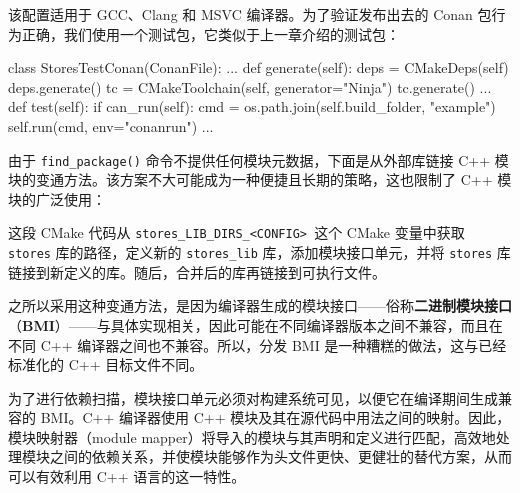 该配置适用于 GCC、Clang 和 MSVC 编译器。为了验证发布出去的 Conan 包行为正确，我们使用一个测试包，它类似于上一章介绍的测试包：

\begin{codebox}[python]
class StoresTestConan(ConanFile):
    ...
    def generate(self):
        deps = CMakeDeps(self)
        deps.generate()
        tc = CMakeToolchain(self, generator="Ninja")
        tc.generate()
    ...
    def test(self):
        if can_run(self):
            cmd = os.path.join(self.build_folder, "example")
            self.run(cmd, env="conanrun")
    ...
\end{codebox}

\label{idx:775}
\label{idx:776}
由于 \texttt{find\_\allowbreak{}package(\allowbreak{})\allowbreak{}} 命令不提供任何模块元数据，下面是从外部库链接 C++ 模块的变通方法。该方案不大可能成为一种便捷且长期的策略，这也限制了 C++ 模块的广泛使用：


这段 CMake 代码从 \texttt{stores\_\allowbreak{}LIB\_\allowbreak{}DIRS\_\allowbreak{}<CONFIG> }这个 CMake 变量中获取 \texttt{stores} 库的路径，定义新的 \texttt{stores\_\allowbreak{}lib} 库，添加模块接口单元，并将 \texttt{stores} 库链接到新定义的库。随后，合并后的库再链接到可执行文件。

\label{idx:777}
之所以采用这种变通方法，是因为编译器生成的模块接口——俗称\textbf{二进制模块接口}（\textbf{BMI}）——与具体实现相关，因此可能在不同编译器版本之间不兼容，而且在不同 C++ 编译器之间也不兼容。所以，分发 BMI 是一种糟糕的做法，这与已经标准化的 C++ 目标文件不同。

\label{idx:778}
\label{idx:779}
为了进行依赖扫描，模块接口单元必须对构建系统可见，以便它在编译期间生成兼容的 BMI。C++ 编译器使用 C++ 模块及其在源代码中用法之间的映射。因此，模块映射器（module mapper）将导入的模块与其声明和定义进行匹配，高效地处理模块之间的依赖关系，并使模块能够作为头文件更快、更健壮的替代方案，从而可以有效利用 C++ 语言的这一特性。

